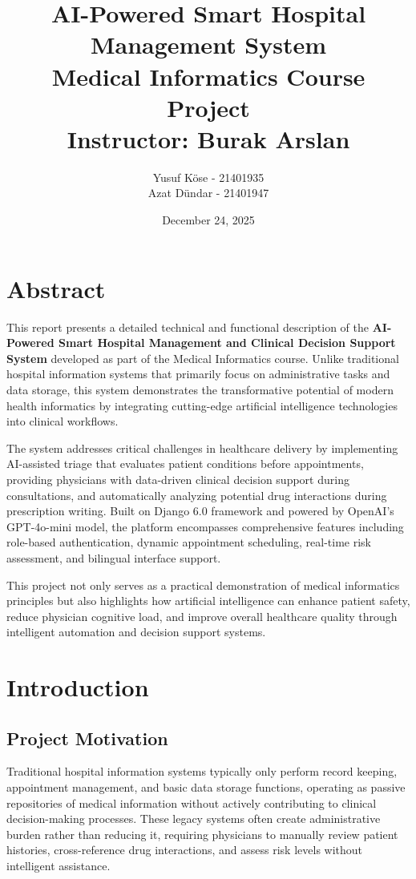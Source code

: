 \documentclass[12pt,a4paper]{article}
\title{
    \textbf{AI-Powered Smart Hospital Management System} \\
    \large Medical Informatics Course Project \\
    \vspace{0.5cm}
    \normalsize Instructor: Burak Arslan
}
\author{Yusuf Köse - 21401935 \\ Azat Dündar - 21401947}
\date{December 24, 2025}
\begin{document}
\maketitle
\newpage

\tableofcontents
\newpage

\section{Abstract}
This report presents a detailed technical and functional description of the \textbf{AI-Powered Smart Hospital Management and Clinical Decision Support System} developed as part of the Medical Informatics course. Unlike traditional hospital information systems that primarily focus on administrative tasks and data storage, this system demonstrates the transformative potential of modern health informatics by integrating cutting-edge artificial intelligence technologies into clinical workflows.

The system addresses critical challenges in healthcare delivery by implementing AI-assisted triage that evaluates patient conditions before appointments, providing physicians with data-driven clinical decision support during consultations, and automatically analyzing potential drug interactions during prescription writing. Built on Django 6.0 framework and powered by OpenAI's GPT-4o-mini model, the platform encompasses comprehensive features including role-based authentication, dynamic appointment scheduling, real-time risk assessment, and bilingual interface support.

This project not only serves as a practical demonstration of medical informatics principles but also highlights how artificial intelligence can enhance patient safety, reduce physician cognitive load, and improve overall healthcare quality through intelligent automation and decision support systems.

\section{Introduction}

\subsection{Project Motivation}
Traditional hospital information systems typically only perform record keeping, appointment management, and basic data storage functions, operating as passive repositories of medical information without actively contributing to clinical decision-making processes. These legacy systems often create administrative burden rather than reducing it, requiring physicians to manually review patient histories, cross-reference drug interactions, and assess risk levels without intelligent assistance.
\end{document}
